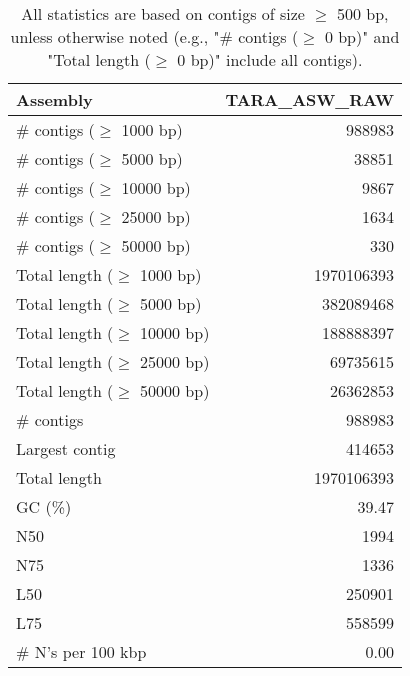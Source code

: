 \documentclass[12pt,a4paper]{article}
\begin{document}
\begin{table}[ht]
\begin{center}
\caption{All statistics are based on contigs of size $\geq$ 500 bp, unless otherwise noted (e.g., "\# contigs ($\geq$ 0 bp)" and "Total length ($\geq$ 0 bp)" include all contigs).}
\begin{tabular}{|l*{1}{|r}|}
\hline
Assembly & TARA\_ASW\_RAW \\ \hline
\# contigs ($\geq$ 1000 bp) & 988983 \\ \hline
\# contigs ($\geq$ 5000 bp) & 38851 \\ \hline
\# contigs ($\geq$ 10000 bp) & 9867 \\ \hline
\# contigs ($\geq$ 25000 bp) & 1634 \\ \hline
\# contigs ($\geq$ 50000 bp) & 330 \\ \hline
Total length ($\geq$ 1000 bp) & 1970106393 \\ \hline
Total length ($\geq$ 5000 bp) & 382089468 \\ \hline
Total length ($\geq$ 10000 bp) & 188888397 \\ \hline
Total length ($\geq$ 25000 bp) & 69735615 \\ \hline
Total length ($\geq$ 50000 bp) & 26362853 \\ \hline
\# contigs & 988983 \\ \hline
Largest contig & 414653 \\ \hline
Total length & 1970106393 \\ \hline
GC (\%) & 39.47 \\ \hline
N50 & 1994 \\ \hline
N75 & 1336 \\ \hline
L50 & 250901 \\ \hline
L75 & 558599 \\ \hline
\# N's per 100 kbp & 0.00 \\ \hline
\end{tabular}
\end{center}
\end{table}
\end{document}
